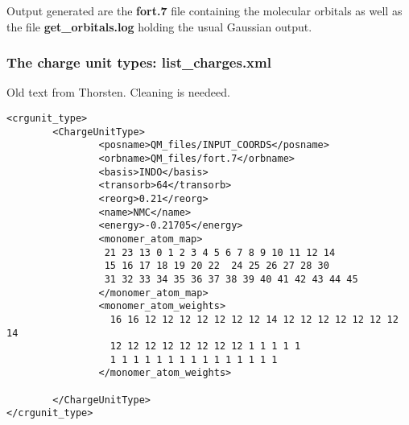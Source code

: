 Output generated are the {\bf fort.7} file containing the molecular orbitals as well as the file {\bf get\_orbitals.log} holding the usual Gaussian output. 

\subsubsection{The charge unit types: list\_charges.xml}


{\color{red} Old text from Thorsten. Cleaning is needeed.}

\begin{verbatim}
<crgunit_type>
        <ChargeUnitType>
                <posname>QM_files/INPUT_COORDS</posname>
                <orbname>QM_files/fort.7</orbname>
                <basis>INDO</basis>
                <transorb>64</transorb>
                <reorg>0.21</reorg>
                <name>NMC</name>
                <energy>-0.21705</energy>
                <monomer_atom_map>
                 21 23 13 0 1 2 3 4 5 6 7 8 9 10 11 12 14
                 15 16 17 18 19 20 22  24 25 26 27 28 30
                 31 32 33 34 35 36 37 38 39 40 41 42 43 44 45
                </monomer_atom_map>
                <monomer_atom_weights>
                  16 16 12 12 12 12 12 12 12 14 12 12 12 12 12 12 12 14
                  12 12 12 12 12 12 12 12 1 1 1 1 1
                  1 1 1 1 1 1 1 1 1 1 1 1 1 1 1
                </monomer_atom_weights>

        </ChargeUnitType>
</crgunit_type>
\end{verbatim}

